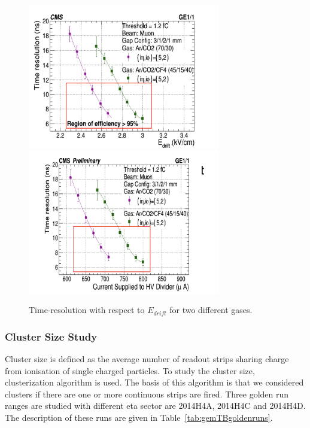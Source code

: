 \begin{figure}[!htbp]
\centering
\includegraphics[width=0.75\textwidth]{figures/GEM/TimeResolution_Edrift.jpeg}\\
\includegraphics[width=0.75\textwidth]{figures/GEM/TimeResolution_Current.jpeg}\\
\caption{Time-resolution with respect to $E_{drift}$ for two different gases.}
\label{TimeResolution}
\end{figure}



\subsubsection{Cluster Size Study}

Cluster size is defined as the average number of readout strips sharing charge from ionisation of single charged particles.
To study the cluster size, clusterization algorithm is used. The basis of this algorithm is that we considered clusters if there are one or more continuous strips are fired.
Three golden run ranges are studied with different eta sector are 2014H4A, 2014H4C and 2014H4D.
The description of these runs are given in Table~\ref{tab:gemTBgoldenruns}.

